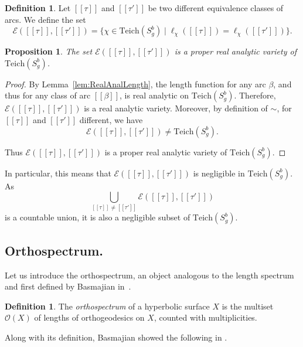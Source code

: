 \documentclass[a4paper,12pt]{article}
\newtheorem{proposition}[theorem]{Proposition}
\theoremstyle{definition}
\newtheorem{definition}[theorem]{Definition}
\theoremstyle{remark}
\begin{document}
\begin{definition}
    Let $[[\tau]]$ and $[[\tau']]$ be two different equivalence classes of arcs. We define the set
    \[
        \mathcal{E}([[\tau]],[[\tau']])=\{ \chi \in \mathrm{Teich}(S_g^b) \mid \ell_\chi([[\tau]]) = \ell_\chi([[\tau']])  \}.
    \]
\end{definition}

\begin{proposition}\label{prop:E_negligible}
    The set $\mathcal{E}([[\tau]],[[\tau']])$ is a proper real analytic variety of $\mathrm{Teich}(S_g^b)$.
\end{proposition}

\begin{proof}
    By Lemma~\ref{lem:RealAnalLength}, the length function for any arc $\beta$, and thus for any class of arc $[[\beta]]$, is real analytic on $\mathrm{Teich}(S_g^b)$. Therefore, $\mathcal{E}([[\tau]],[[\tau']])$ is a real analytic variety. Moreover, by definition of $\sim$, for $[[\tau]]$ and $[[\tau']]$ different, we have 
    \[
        \mathcal{E}([[\tau]],[[\tau']]) \neq \mathrm{Teich}(S_g^b).
    \]
    
    Thus $\mathcal{E}([[\tau]],[[\tau']])$ is a proper real analytic variety of $\mathrm{Teich}(S_g^b)$.
\end{proof}

In particular, this means that $\mathcal{E}([[\tau]],[[\tau']])$ is negligible in $\mathrm{Teich}(S_g^b)$. As 
\[
    \bigcup_{[[\tau]]\neq [[\tau']]} \mathcal{E}([[\tau]],[[\tau']])
\]
is a countable union, it is also a negligible subset of $\mathrm{Teich}(S_g^b)$.






\subsection{Orthospectrum.}

Let us introduce the orthospectrum, an object analogous to the length spectrum and first defined by Basmajian in~\cite{Basmajian}.

\begin{definition}
    The \emph{orthospectrum} of a hyperbolic surface $X$ is the multiset $\mathcal{O}(X)$ of lengths of orthogeodesics on $X$, counted with multiplicities.
\end{definition}

Along with its definition, Basmajian showed the following in \cite{Basmajian}.
\end{document}
